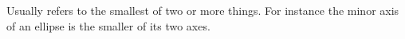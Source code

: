 Usually refers to the smallest of two or more things.
For instance the minor axis of an ellipse is the smaller
of its two axes.